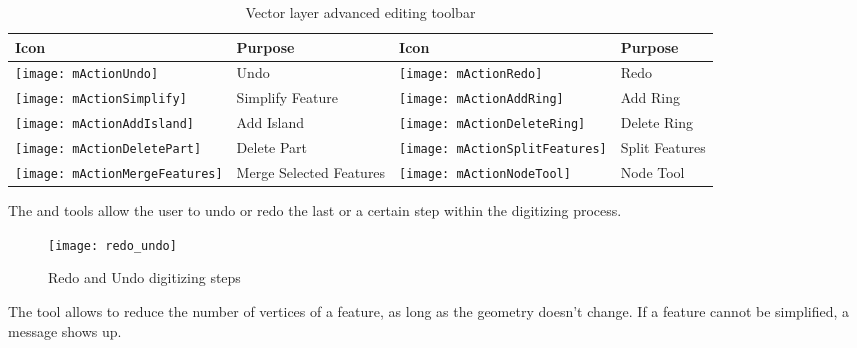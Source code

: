 \begin{table}[h]
\centering
\caption{Vector layer advanced editing toolbar}\label{tab:advanced_editing}\medskip
\small
\begin{tabular}{|l|p{6.9cm}|l|p{6.9cm}|}
\hline \textbf{Icon} & \textbf{Purpose} & \textbf{Icon} & \textbf{Purpose} \\
\hline \texttt{[image: mActionUndo]}
   & Undo 
   & \texttt{[image: mActionRedo]}
   & Redo \\
\hline \texttt{[image: mActionSimplify]}
   & Simplify Feature
   & \texttt{[image: mActionAddRing]}
   & Add Ring \\
\hline \texttt{[image: mActionAddIsland]}
   & Add Island
   & \texttt{[image: mActionDeleteRing]}
   & Delete Ring \\
\hline \texttt{[image: mActionDeletePart]}
   & Delete Part
   & \texttt{[image: mActionSplitFeatures]}
   & Split Features \\
\hline \texttt{[image: mActionMergeFeatures]}
   & Merge Selected Features
   & \texttt{[image: mActionNodeTool]}
   & Node Tool \\
\hline
\end{tabular}
\end{table}


The  and  tools
allow the user to undo or redo the last or a certain step within the
digitizing process.  

\begin{figure}[ht]
   \begin{center}
   \caption{Redo and Undo digitizing steps \nixcaption}\label{fig:vector_redoundo}\smallskip
   \texttt{[image: redo\_undo]}
\end{center}
\end{figure}


The  tool allows to reduce the
number of vertices of a feature, as long as the geometry doesn't change. If a
feature cannot be simplified, a message shows up.


